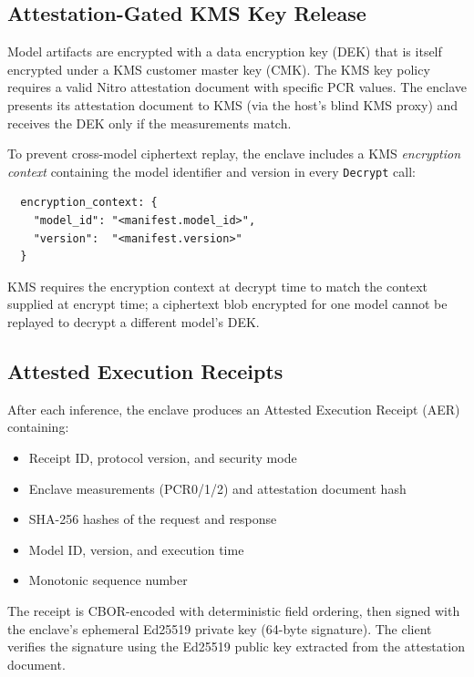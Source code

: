 \documentclass[11pt,a4paper]{article}
\begin{document}
\subsection{Attestation-Gated KMS Key Release}

Model artifacts are encrypted with a data encryption key (DEK) that is itself encrypted under a KMS customer master key (CMK).
The KMS key policy requires a valid Nitro attestation document with specific PCR values.
The enclave presents its attestation document to KMS (via the host's blind KMS proxy) and receives the DEK only if the measurements match.

To prevent cross-model ciphertext replay, the enclave includes a KMS \emph{encryption context} containing the model identifier and version in every \texttt{Decrypt} call:

\begin{verbatim}
  encryption_context: {
    "model_id": "<manifest.model_id>",
    "version":  "<manifest.version>"
  }
\end{verbatim}

KMS requires the encryption context at decrypt time to match the context supplied at encrypt time; a ciphertext blob encrypted for one model cannot be replayed to decrypt a different model's DEK.

\subsection{Attested Execution Receipts}

After each inference, the enclave produces an Attested Execution Receipt (AER) containing:

\begin{itemize}
  \item Receipt ID, protocol version, and security mode
  \item Enclave measurements (PCR0/1/2) and attestation document hash
  \item SHA-256 hashes of the request and response
  \item Model ID, version, and execution time
  \item Monotonic sequence number
\end{itemize}

The receipt is CBOR-encoded with deterministic field ordering, then signed with the enclave's ephemeral Ed25519 private key (64-byte signature).
The client verifies the signature using the Ed25519 public key extracted from the attestation document.
\end{document}
